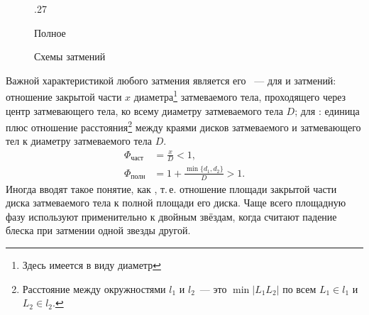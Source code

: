 \begin{wrapfigure}[15]{r}{.27\tw}
\begin{subcaptionblock}[t]{.27\tw}
        \caption{Полное}
        \label{pic:full-esclipse-phase}
    \end{subcaptionblock}
    \caption{Схемы затмений}
    \label{fig:part-eclipses-scheme}
\end{wrapfigure}
Важной характеристикой любого затмения является его ~--- для  и  затмений: отношение закрытой части $x$ диаметра\footnote{Здесь имеется в виду  диаметр} затмеваемого тела, проходящего через центр затмевающего тела, ко всему диаметру затмеваемого тела $D$; для : единица плюс отношение расстояния\footnote{Расстояние между окружностями $l_1$ и $l_2$~--- это $\min |L_1L_2|$ по всем $L_1 \in l_1$ и $L_2 \in l_2$.} между краями дисков затмеваемого и затмевающего тел к диаметру затмеваемого тела $D$.
\begin{align}
    \Phi_{\text{част}} &= \frac{x}{D}< 1,\\
    \Phi_{\text{полн}} &= 1 + \frac{\min\{d_1, d_2\}}{D}> 1.
\end{align}
Иногда вводят такое понятие, как , т.\,е. отношение площади закрытой части диска затмеваемого тела к полной площади его диска. Чаще всего площадную фазу используют применительно к двойным звёздам, когда считают падение блеска при затмении одной звезды другой.
